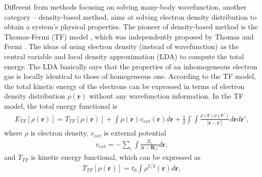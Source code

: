 Different from methods focusing on solving many-body wavefunction, another category -- density-based method, aims at solving electron density distribution to obtain a system's physical properties. The pioneer of density-based method is the Thomas-Fermi (TF) model , which was independently proposed by Thomas and Fermi \cite{thomas1927calculation,fermi1928statistische}. The ideas of using electron density (instead of wavefunction) as the central variable and local density approximation (LDA) to compute the total energy. 
The LDA basically says that the properties of an inhomogeneous electron gas is locally identical to those of homogeneous one. According to the TF model, the total kinetic energy of the electrons can be expressed in terms of electron density distribution  $\rho(\textbf{r})$ without any wavefunction information. In the TF model, the total energy functional is
	\begin{equation}
		\label{eq:tf}
		\begin{aligned}
			E_{TF}[\rho(\textbf{r})] = T_{TF}[\rho(\textbf{r})] + \int \rho(\textbf{r})v_{ext}(\textbf{r})d\textbf{r} +
			\frac{1}{2} \int \int \frac{\rho(\textbf{r}) \rho(\textbf{r}')}{\left|\textbf{r} - \textbf{r}'  \right|}d\textbf{r} d\textbf{r}',
		\end{aligned}
	\end{equation}
where $\rho$ is electron density, $v_{ext}$ is external potential
	\begin{equation}
		\begin{aligned}
			v_{ext} = -\sum_i \int \frac{Z_i}{\left| \textbf{r}-\textbf{R}_i \right|} d\textbf{r},
		\end{aligned}
	\end{equation}
and $T_{TF}$ is kinetic energy functional, which can be expressed as
	\begin{equation}
		\begin{aligned}
			T_{TF}[\rho(\textbf{r})] = t_0\int \rho^{5/3}(\textbf{r}) d\textbf{r},
		\end{aligned}
	\end{equation}
